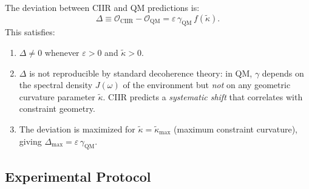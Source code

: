 \begin{theorem}\label{thm:12.14}
The deviation between CIIR and QM predictions is:
\begin{equation}\label{eq:Delta}
  \Delta \equiv \mathcal{O}_{\mathrm{CIIR}} - \mathcal{O}_{\mathrm{QM}}
  = \varepsilon\,\gamma_{\mathrm{QM}}\,f(\tilde{\kappa}).
\end{equation}
This satisfies:
\begin{enumerate}
  \item $\Delta \neq 0$ whenever $\varepsilon > 0$ and $\tilde{\kappa} > 0$.
  \item $\Delta$ is not reproducible by standard decoherence theory:
    in QM, $\gamma$ depends on the spectral density $J(\omega)$ of the
    environment but \emph{not} on any geometric curvature parameter
    $\tilde{\kappa}$.  CIIR predicts a \emph{systematic shift} that
    correlates with constraint geometry.
  \item The deviation is maximized for $\tilde{\kappa} = \tilde{\kappa}_{\max}$
    (maximum constraint curvature), giving
    $\Delta_{\max} = \varepsilon\,\gamma_{\mathrm{QM}}$.
\end{enumerate}
\end{theorem}

\subsection{Experimental Protocol}


